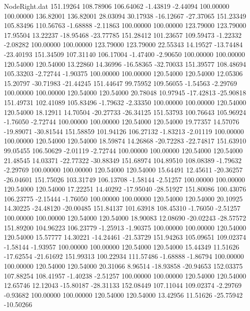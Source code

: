 \begin{filecontents}{NodeRight.dat}
 151.19264  108.78906  106.64062    -1.43819   -2.44094  100.00000  100.00000  136.82001  136.82001   28.03094   30.17938  -16.12667  -27.37065
 151.23349  105.83496  110.56763    -1.68888   -2.11863  100.00000  100.00000  123.79000  123.79000   17.95504   13.22237  -18.95468  -23.77785
 151.28412  101.23657  109.59473    -1.22332   -2.08282  100.00000  100.00000  123.79000  123.79000   22.55343   14.19527  -13.74484  -23.40193
 151.34509  107.31140  106.17004    -1.47400   -2.90650  100.00000  100.00000  120.54000  120.54000   13.22860   14.36996  -16.58365  -32.70033
 151.39577  108.48694  105.33203    -2.72744   -1.90375  100.00000  100.00000  120.54000  120.54000   12.05306   15.20797  -30.71983  -21.44245
 151.44647   99.75952  109.56055    -1.54563   -2.29769  100.00000  100.00000  120.54000  120.54000   20.78048   10.97945  -17.42813  -25.90818
 151.49731  102.41089  105.83496    -1.79632   -2.33350  100.00000  100.00000  120.54000  120.54000   18.12911   14.70504  -20.27733  -26.34125
 151.53793  100.76643  105.96924    -1.76050   -2.72744  100.00000  100.00000  120.54000  120.54000   19.77357   14.57076  -19.89071  -30.81544
 151.58859  101.94126  106.27132    -1.83213   -2.01119  100.00000  100.00000  120.54000  120.54000   18.59874   14.26868  -20.72283  -22.74817
 151.63910   99.05455  106.50629    -2.01119   -2.72744  100.00000  100.00000  120.54000  120.54000   21.48545   14.03371  -22.77322  -30.88349
 151.68974  104.89510  108.08389    -1.79632   -2.29769  100.00000  100.00000  120.54000  120.54000   15.64491   12.45611  -20.36257  -26.04601
 151.75026  103.31749  106.13708    -1.58144   -2.51257  100.00000  100.00000  120.54000  120.54000   17.22251   14.40292  -17.95040  -28.51927
 151.80086  100.43076  106.23775    -2.15444   -1.76050  100.00000  100.00000  120.54000  120.54000   20.10925   14.30225  -24.48120  -20.00485
 151.84137  101.63918  108.45310    -1.76050   -2.51257  100.00000  100.00000  120.54000  120.54000   18.90083   12.08690  -20.02243  -28.57572
 151.89200  104.96223  106.23779    -1.25913   -1.90375  100.00000  100.00000  120.54000  120.54000   15.57777   14.30221  -14.24461  -21.53729
 151.94263  105.09651  109.02374    -1.58144   -1.93957  100.00000  100.00000  120.54000  120.54000   15.44349   11.51626  -17.62554  -21.61692
 151.99313  100.22934  111.57486    -1.68888   -1.86794  100.00000  100.00000  120.54000  120.54000   20.31066    8.96514  -18.93858  -20.94653
 152.03375  107.88254  108.41957    -1.40238   -2.51257  100.00000  100.00000  120.54000  120.54000   12.65746   12.12043  -15.80187  -28.31133
 152.08449  107.11044  109.02374    -2.29769   -0.93682  100.00000  100.00000  120.54000  120.54000   13.42956   11.51626  -25.75942  -10.50266

\end{filecontents}
